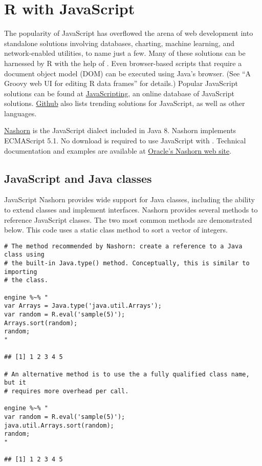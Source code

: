 \section{R with JavaScript}

The popularity of JavaScript has overflowed the arena of web development into standalone solutions involving databases, charting, machine learning, and network-enabled utilities, to name just a few. Many of these solutions can be harnessed by R with the help of . Even browser-based scripts that require a document object model (DOM) can be executed using Java's  browser. (See “A Groovy web UI for editing R data frames” for  details.) Popular JavaScript solutions can be found at \href{https://www.javascripting.com/}{JavaScripting}, an online database of JavaScript solutions. \href{https://github.com/trending/javascript?since=monthly}{Github} also lists trending solutions for JavaScript, as well as other languages.

\href{https://docs.oracle.com/javase/8/docs/technotes/guides/scripting/nashorn/}{Nashorn} is the JavaScript dialect included in Java 8. Nashorn implements ECMAScript 5.1. No download is required to use JavaScript with . Technical documentation and examples are available at \href{https://docs.oracle.com/javase/8/docs/technotes/guides/scripting/nashorn/}{Oracle's Nashorn web site}.

\subsection{JavaScript and Java classes}

JavaScript Nashorn provides wide support for Java classes, including the ability to extend classes and implement interfaces. Nashorn provides several methods to reference JavaScript classes. The two most common methods are demonstrated below. This code uses a static class method to sort a vector of integers.

\begin{verbatim}
# The method recommended by Nashorn: create a reference to a Java class using
# the built-in Java.type() method. Conceptually, this is similar to importing
# the class.

engine %~% "
var Arrays = Java.type('java.util.Arrays');
var random = R.eval('sample(5)');
Arrays.sort(random);
random;
"

## [1] 1 2 3 4 5

# An alternative method is to use the a fully qualified class name, but it
# requires more overhead per call.

engine %~% "
var random = R.eval('sample(5)');
java.util.Arrays.sort(random);
random;
"

## [1] 1 2 3 4 5
\end{verbatim}


